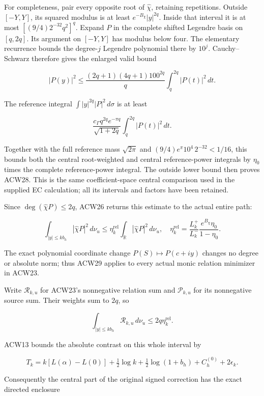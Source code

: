 \documentclass[11pt,a4paper]{article}
\begin{document}
For completeness, pair every opposite root of \(\widehat\chi\), retaining repetitions. Outside \([-Y,Y]\), its squared modulus is at least
\(e^{-B_\chi}|y|^{2q}\). Inside that interval it is at most
\([(9/4)2^{-32}q^2]^q\).
Expand \(P\) in the complete shifted Legendre basis on \([q,2q]\). Its argument on \([-Y,Y]\) has modulus below four. The elementary recurrence bounds the degree-\(j\) Legendre polynomial there by \(10^j\). Cauchy--Schwarz therefore gives the enlarged valid bound

\[
|P(y)|^2\le
\frac{(2q+1)(4q+1)100^{2q}}q
\int_q^{2q}|P(t)|^2\,dt.
\]

The reference integral
\(\int|y|^{2q}|P|^2\,d\sigma\) is at least

\[
\frac{c_\Gamma q^{2q}e^{-\pi q}}{\sqrt{1+2q}}
\int_q^{2q}|P(t)|^2\,dt.
\]

Together with the full reference mass \(\sqrt{2\pi}\) and
\((9/4)e^\pi10^4\,2^{-32}<1/16\), this bounds both the central root-weighted and central reference-power integrals by \(\eta_0\) times the complete reference-power integral. The outside lower bound then proves ACW28. This is the same coefficient-space central comparison used in the supplied EC calculation; all its intervals and factors have been retained.

Since \(\deg(\widehat\chi P)\le2q\), ACW26 returns this estimate to the actual entire path:

\[
\boxed{
\int_{|y|\le kb_h}|\widehat\chi P|^2\,d\nu_u
\le\eta_k^{\mathrm{rel}}\int_{\mathbb R}|\widehat\chi P|^2\,d\nu_u,
\quad
\eta_k^{\mathrm{rel}}=
\frac{L_k^+}{L_k^-}\frac{e^{B_\chi}\eta_0}{1-\eta_0}.}
\tag{ACW29}
\]

The exact polynomial coordinate change \(P(S)\mapsto P(c+iy)\) changes no degree or absolute norm; thus ACW29 applies to every actual monic relation minimizer in ACW23.

Write \(\mathcal R_{k,u}\) for ACW23's nonnegative relation sum and \(\mathcal P_{k,u}\) for its nonnegative source sum. Their weights sum to \(2q\), so

\[
\int_{|y|\le kb_h}\mathcal R_{k,u}\,d\nu_u
\le2q\eta_k^{\mathrm{rel}}.
\]

ACW13 bounds the absolute contrast on this whole interval by

\[
T_k=k[L(\alpha)-L(0)]
+\tfrac12\log k+\tfrac12\log(1+b_h)+C_h^{(0)}+2\epsilon_k.
\]

Consequently the central part of the original signed correction has the exact directed enclosure
\end{document}
